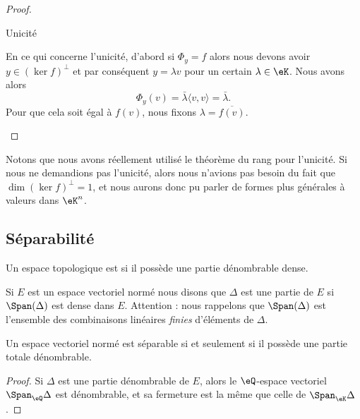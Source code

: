 \begin{proof}
\begin{subproof}
		\item[Unicité]

		En ce qui concerne l'unicité, d'abord si \(  \Phi_y= f\) alors nous devons avoir \( y\in(\ker f)^{\perp}\) et par conséquent \( y=\lambda v\) pour un certain \( \lambda\in \eK\). Nous avons alors
		\begin{equation}
			\Phi_y(v)=\bar\lambda\langle v, v\rangle =\bar\lambda.
		\end{equation}
		Pour que cela soit égal à \(  f(v)\), nous fixons \( \lambda=\overline{  f(v) }\).
	\end{subproof}
\end{proof}
Notons que nous avons réellement utilisé le théorème du rang pour l'unicité. Si nous ne demandions pas l'unicité, alors nous n'avions pas besoin du fait que \( \dim(\ker f)^{\perp}=1\), et nous aurons donc pu parler de formes plus générales à valeurs dans \( \eK^n\).

\subsection{Séparabilité}

\begin{definition}      \label{DEFooSFOJooGICSbT}
	Un espace topologique est  si il possède une partie dénombrable dense.
\end{definition}

\begin{definition}      \label{DEFooQVPHooJaSWyF}
	Si \( E\) est un espace vectoriel normé nous disons que \( \Delta\) est une partie  de \( E\) si \( \Span(\Delta)\) est dense dans \( E\). Attention : nous rappelons que \( \Span(\Delta)\) est l'ensemble des combinaisons linéaires \emph{finies} d'éléments de \( \Delta\).
\end{definition}

\begin{proposition}     \label{PROPooZMWHooVwvNBY}
	Un espace vectoriel normé est séparable si et seulement si il possède une partie totale dénombrable.
\end{proposition}

\begin{proof}
	Si \( \Delta\) est une partie dénombrable de \( E\), alors le \( \eQ\)-espace vectoriel \( \Span_{\eQ}\Delta\) est dénombrable, et sa fermeture est la même que celle de \( \Span_{\eK}\Delta\).
\end{proof}


